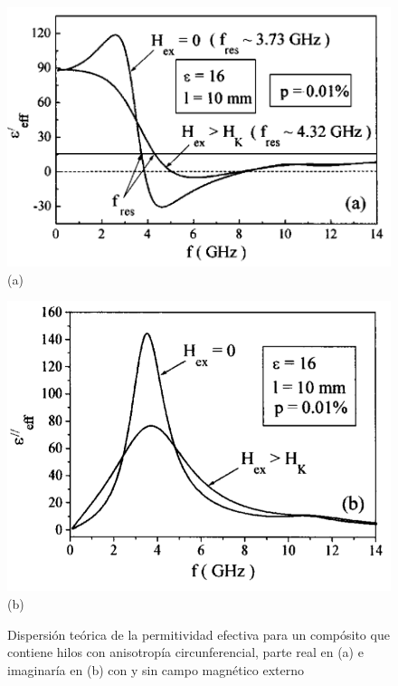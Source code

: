 \documentclass[12pt,letterpaper]{article}
\numberwithin{equation}{section}
\begin{document}
\begin{figure}[H]
	\begin{minipage}{0.5\linewidth}
		\hspace{-20mm}
		\centering\includegraphics[scale=0.31]{Imagenes/efectivo_real.png}\\
		\centering(a)
	\end{minipage}
	\begin{minipage}{0.5\linewidth}
		\centering\includegraphics[scale=0.35]{Imagenes/efectivo_imaginario.png}\\
		\centering(b)
	\end{minipage}
	\caption{Dispersión teórica de la permitividad efectiva para un compósito que contiene hilos con anisotropía circunferencial, parte real en (a) e imaginaría en (b) con y sin campo magnético externo}
	\label{fig:efectivo}
\end{figure}
\end{document}
